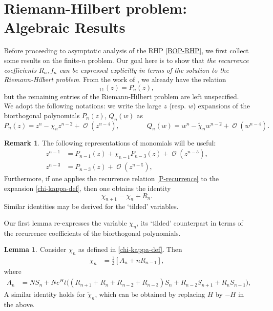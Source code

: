 \documentclass[usenames,dvipsnames]{article}
\theoremstyle{definition}
\newtheorem{lemma}{Lemma}[section]
\newtheorem{remark}{Remark}[section]
\DeclareMathOperator{\OO}{\mathcal{O}}
\numberwithin{equation}{section}
\numberwithin{figure}{section}
\begin{document}
    \section{Riemann-Hilbert problem: Algebraic Results}\label{section:RHPalgebraic}
Before proceeding to asymptotic analysis of the RHP \eqref{BOP-RHP}, we first collect some results on the finite-$n$ problem. Our goal here is to show that \textit{the recurrence coefficients $R_n, f_n$ can be expressed explicitly in terms of the solution to the Riemann-Hilbert problem}. From the work of \cite{KM}, we already have the relation
    \begin{equation*}
        [\boldsymbol{Y}]_{11}(z) = P_n(z),
    \end{equation*}
but the remaining entries of the Riemann-Hilbert problem are left unspecified. We adopt the following notations: we write the large $z$ (resp. $w$) expansions of the biorthogonal polynomials $P_n(z)$, $Q_n(w)$ as
    \begin{equation}\label{chi-kappa-def}
        P_n(z) = z^{n}-\chi_nz^{n-2} + \OO(z^{n-4}),\qquad\qquad Q_n(w) = w^{n}-\tilde{\chi}_nw^{n-2}+\OO(w^{n-4}).
    \end{equation}
\begin{remark}\label{monomial-remark}
    The following representations of monomials will be useful:
    \begin{align*}
        z^{n-1} &= P_{n-1}(z) + \chi_{n-1}P_{n-3}(z) + \OO(z^{n-5}),\\
        z^{n-3} &= P_{n-3}(z) + \OO(z^{n-5}),
    \end{align*}
    Furthermore, if one applies the recurrence relation \eqref{P-recurrence} to the expansion
    \eqref{chi-kappa-def}, then one obtains the identity
        \begin{equation}\label{chi-kappa-recurrence}
            \chi_{n+1} = \chi_{n}+R_n.
        \end{equation}
    Similar identities may be derived for the `tilded' variables.
\end{remark}
Our first lemma re-expresses the variable $\chi_n$, its `tilded' counterpart in terms of the recurrence coefficients of the biorthogonal polynomials.
\begin{lemma}
    Consider $\chi_n$ as defined in \eqref{chi-kappa-def}. Then
        \begin{align}
            \chi_n &= \frac{1}{2}[A_n+nR_{n-1}],
        \end{align}
    where 
        \begin{align}
            A_n &=NS_n + Ne^Ht\big((R_{n+1}+R_{n}+R_{n-2}+R_{n-3})S_n + R_{n-2}S_{n+1} + R_nS_{n-1}\big),
        \end{align}
    A similar identity holds for $\tilde{\chi}_n$, which can be obtained by replacing $H$ by $-H$ in the above.
\end{lemma}
\end{document}
